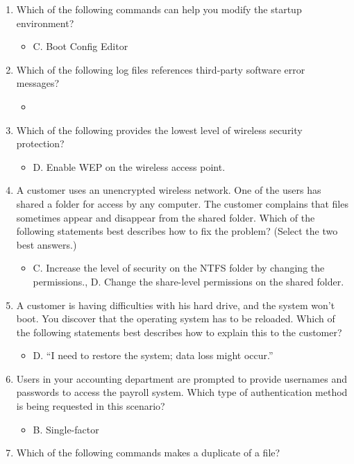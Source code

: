 \documentclass{article}
\begin{document}
\begin{enumerate}
    \item Which of the following commands can help you modify the startup
environment?
    \begin{itemize}
        \item C. Boot Config Editor
    \end{itemize}
    \item Which of the following log files references third-party software
error messages?
    \begin{itemize}
        \item 
    \end{itemize}
    \item Which of the following provides the lowest level of wireless security
protection?
    \begin{itemize}
        \item D. Enable WEP on the wireless access point.
    \end{itemize}
    \item A customer uses an unencrypted wireless network. One of the
users has shared a folder for access by any computer. The customer
complains that files sometimes appear and disappear from
the shared folder. Which of the following statements best describes
how to fix the problem? (Select the two best answers.)
    \begin{itemize}
        \item C. Increase the level of security on the NTFS folder by
changing the permissions., D. Change the share-level permissions on the shared
folder.
    \end{itemize}
    \item A customer is having difficulties with his hard drive, and the system
won’t boot. You discover that the operating system has to be
reloaded. Which of the following statements best describes how to
explain this to the customer?
    \begin{itemize}
        \item D. “I need to restore the system; data loss might occur.”
    \end{itemize}
    \item Users in your accounting department are prompted to provide
usernames and passwords to access the payroll system. Which
type of authentication method is being requested in this scenario?
    \begin{itemize}
        \item B. Single-factor
    \end{itemize}
    \item Which of the following commands makes a duplicate of a file?

\end{enumerate}
\end{document}
